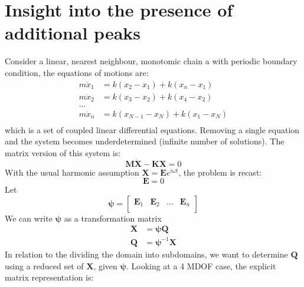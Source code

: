 \chapter{Insight into the presence of additional peaks}\label{appendix:b}
Consider a linear, nearest neighbour, monotomic chain a with periodic boundary condition, the equations of motions are:
\begin{equation}
\begin{split}
m\ddot{x}_1&=k(x_2-x_1)+k(x_n-x_1)\\
m\ddot{x}_2&=k(x_3-x_2)+k(x_4-x_2)\\
...\\
m\ddot{x}_n&=k(x_{N-1}-x_N)+k(x_1-x_N)\\
\end{split}
\end{equation}
which is a set of coupled linear differential equations. Removing a single equation and the system becomes underdetermined (infinite number of solutions). The matrix version of this system is:
\begin{equation}
\bm{M}\bm{\ddot{X}}-\bm{K}\bm{X}=0
\end{equation}
With the usual harmonic assumption $\bm{X}=\bm{E}e^{i\omega t}$, the problem is recast:
\begin{equation}
[\omega^2\bm{M}^{-1}\bm{M}-\bm{M}^{-1}\bm{K}]\bm{E}=0
\end{equation}
Let
\begin{equation}
\bm{\psi}=
\begin{bmatrix}
   \bm{E}_1 & \bm{E}_2 & \dots &\bm{E}_n \\
 \end{bmatrix}
\end{equation}
We can write $\bm{\psi}$ as a transformation matrix
\begin{equation}
\begin{split}
\bm{X}&=\bm{\psi}\bm{Q}\\
\bm{Q}&=\bm{\psi}^{-1}\bm{X}
\end{split}
\end{equation}
In relation to the dividing the domain into subdomains, we want to determine $\bm{Q}$ using a reduced set of $\bm{X}$, given $\bm{\psi}$. Looking at a 4 MDOF case, the explicit matrix representation is:
